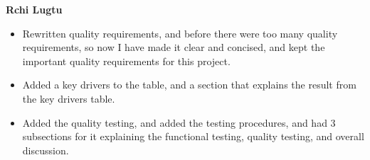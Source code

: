 \textbf{Rchi Lugtu}
\begin{itemize}
	\item Rewritten quality requirements, and before there were too many quality requirements, so now I have made it clear and concised, and kept the important quality requirements for this project.
	\item Added a key drivers to the table, and a section that explains the result from the key drivers table.
	\item Added the quality testing, and added the testing procedures, and had 3 subsections for it explaining the functional testing, quality testing, and overall discussion.
\end{itemize}
